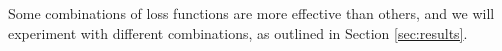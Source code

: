 Some combinations of loss functions are more effective than others, and we will experiment with different combinations, as outlined in Section \ref{sec:results}.

% 
% 

